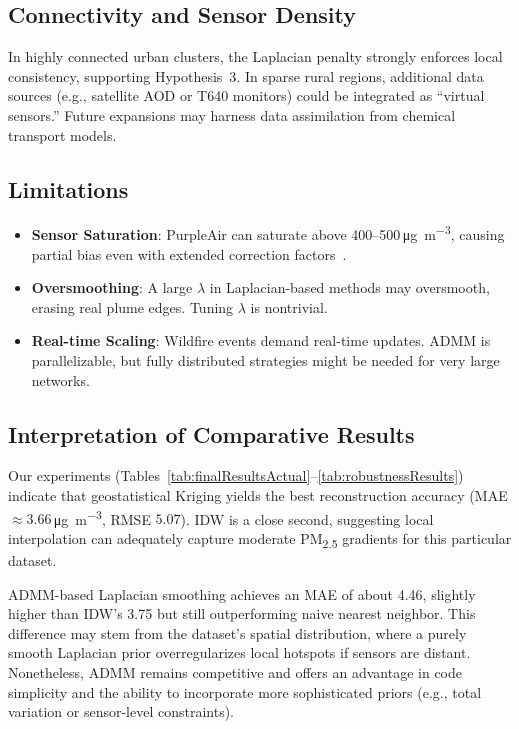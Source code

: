 \documentclass[12pt]{article}                                %
\begin{document}
\subsection{Connectivity and Sensor Density}   %
In highly connected urban clusters, the Laplacian penalty strongly enforces local consistency, 
supporting Hypothesis~3. In sparse rural regions, additional data sources (e.g., satellite 
AOD or T640 monitors) could be integrated as “virtual sensors.” Future expansions may harness 
data assimilation from chemical transport models.

\subsection{Limitations}  %
\begin{itemize}
    \item \textbf{Sensor Saturation}: PurpleAir can saturate above 400--500\,\si{\micro\gram\per\cubic\meter}, 
          causing partial bias even with extended correction factors~\cite{Barkjohn2022Sensors}.
    \item \textbf{Oversmoothing}: A large $\lambda$ in Laplacian-based methods may oversmooth, 
          erasing real plume edges. Tuning $\lambda$ is nontrivial.
    \item \textbf{Real-time Scaling}: Wildfire events demand real-time updates. ADMM is 
          parallelizable, but fully distributed strategies might be needed for very large networks.
\end{itemize}

\subsection{Interpretation of Comparative Results}
\label{sec:discussionInterpretation}   %

Our experiments (Tables~\ref{tab:finalResultsActual}--\ref{tab:robustnessResults}) 
indicate that geostatistical Kriging yields the best reconstruction accuracy (MAE 
$\approx3.66$\,\si{\micro\gram\per\cubic\meter}, RMSE $5.07$). IDW is a close second, 
suggesting local interpolation can adequately capture moderate PM\textsubscript{2.5} 
gradients for this particular dataset.

ADMM-based Laplacian smoothing achieves an MAE of about 4.46, slightly higher than IDW’s 
3.75 but still outperforming naive nearest neighbor. This difference may stem from the 
dataset’s spatial distribution, where a purely smooth Laplacian prior overregularizes local 
hotspots if sensors are distant. Nonetheless, ADMM remains competitive and offers an 
advantage in code simplicity and the ability to incorporate more sophisticated priors 
(e.g., total variation or sensor-level constraints).
\end{document}
